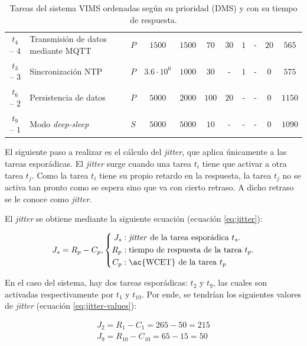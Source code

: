 \begin{table}[H]
\begin{tabularx}{\linewidth}{c|X|c|c|c|c|c|c|c|c|c}
    $t_{4}$ -- $4$   & Transmisión de datos mediante MQTT     & $P$           & $1500$                & $1500$                & $70$  & $30$  & $1$   & -     & $20$  & $565$  \\
    $t_{3}$ -- $3$   & Sincronización NTP                     & $P$           & $3.6 \cdot 10^6$      & $1000$                & $30$  & -     & $1$   & -     & $0$   & $575$  \\
    $t_{6}$ -- $2$   & Persistencia de datos                  & $P$           & $5000$                & $2000$                & $100$ & $20$  & -     & -     & $0$   & $1150$ \\
    $t_{9}$ -- $1$   & Modo \textit{deep-sleep}               & $S$           & $5000$                & $5000$                & $10$  & -     & -     & -     & $0$   & $1090$ \\
    \hline
  \end{tabularx}
  \caption{Tareas del sistema \ac{VIMS} ordenadas según su prioridad (\ac{DMS}) y con su tiempo de respuesta.}
  \label{tab:rt-rta}
\end{table}

El siguiente paso a realizar es el cálculo del \textit{jitter}, que aplica únicamente
a las tareas esporádicas. El \textit{jitter} surge cuando una tarea $t_i$ tiene que
activar a otra tarea $t_j$. Como la tarea $t_i$ tiene su propio retardo en la respuesta,
la tarea $t_j$ no se activa tan pronto como se espera sino que va con cierto retraso.
A dicho retraso se le conoce como \textit{jitter}.

El \textit{jitter} se obtiene mediante la siguiente ecuación (ecuación \ref{eq:jitter}):

\begin{equation}\label{eq:jitter}
  J_s = R_p - C_p, \left\{\begin{aligned}
    J_s & : \text{\textit{jitter} de la tarea esporádica $t_s$.} \\
    R_p & : \text{tiempo de respuesta de la tarea $t_p$.}        \\
    C_p & : \text{\ac{WCET} de la tarea $t_p$}
  \end{aligned}\right.
\end{equation}

En el caso del sistema, hay dos tareas esporádicas: $t_2$ y $t_9$, las cuales son
activadas respectivamente por $t_1$ y $t_10$. Por ende, se tendrían los siguientes
valores de \textit{jitter} (ecuación \ref{eq:jitter-values}):

\begin{gather}\label{eq:jitter-values}
  J_2 = R_1 - C_1 = 265 - 50 = 215 \\
  J_9 = R_{10} - C_{10} = 65 - 15 = 50
\end{gather}

